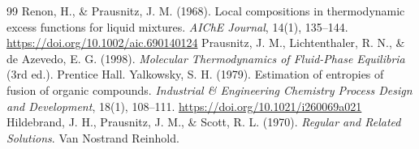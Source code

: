 \documentclass[11pt]{article}
\begin{document}
\begin{thebibliography}{99}
   Renon, H., \& Prausnitz, J. M. (1968). Local compositions in thermodynamic excess functions for liquid mixtures. \textit{AIChE Journal}, 14(1), 135--144. \url{https://doi.org/10.1002/aic.690140124}
   Prausnitz, J. M., Lichtenthaler, R. N., \& de Azevedo, E. G. (1998). \textit{Molecular Thermodynamics of Fluid-Phase Equilibria} (3rd ed.). Prentice Hall.
   Yalkowsky, S. H. (1979). Estimation of entropies of fusion of organic compounds. \textit{Industrial \& Engineering Chemistry Process Design and Development}, 18(1), 108--111. \url{https://doi.org/10.1021/i260069a021}
   Hildebrand, J. H., Prausnitz, J. M., \& Scott, R. L. (1970). \textit{Regular and Related Solutions}. Van Nostrand Reinhold.


\end{thebibliography}
\end{document}
